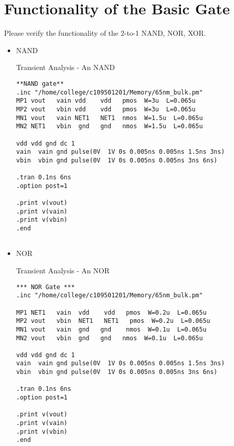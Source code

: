 \documentclass[a4paper]{article}
\newenvironment{code}{\captionsetup{type=listing, font=large, name=List.}}{}
\begin{document}
    \section {\bf Functionality of the Basic Gate}
    
        Please verify the functionality of the 2-to-1 NAND, NOR, XOR.
        \hspace*{1em}
        \begin{itemize}

            \item NAND

\begin{code}
    \caption{Transient Analysis - An NAND}
    \begin{verbatim}
**NAND gate**
.inc "/home/college/c109501201/Memory/65nm_bulk.pm"
MP1 vout   vain vdd    vdd   pmos  W=3u  L=0.065u
MP2 vout   vbin vdd    vdd   pmos  W=3u  L=0.065u
MN1 vout   vain NET1   NET1  nmos  W=1.5u  L=0.065u
MN2 NET1   vbin  gnd   gnd   nmos  W=1.5u  L=0.065u

vdd vdd gnd dc 1
vain  vain gnd pulse(0V  1V 0s 0.005ns 0.005ns 1.5ns 3ns)
vbin  vbin gnd pulse(0V  1V 0s 0.005ns 0.005ns 3ns 6ns)

.tran 0.1ns 6ns
.option post=1

.print v(vout)
.print v(vain)
.print v(vbin)
.end
        
\end{verbatim}
    \end{code}

\item NOR

\begin{code}
\caption{Transient Analysis - An NOR}
\begin{verbatim}
*** NOR Gate ***
.inc "/home/college/c109501201/Memory/65nm_bulk.pm"

MP1 NET1   vain  vdd    vdd   pmos  W=0.2u  L=0.065u
MP2 vout   vbin  NET1   NET1   pmos  W=0.2u  L=0.065u
MN1 vout   vain  gnd   gnd    nmos  W=0.1u  L=0.065u
MN2 vout   vbin  gnd   gnd   nmos  W=0.1u  L=0.065u

vdd vdd gnd dc 1
vain  vain gnd pulse(0V  1V 0s 0.005ns 0.005ns 1.5ns 3ns)
vbin  vbin gnd pulse(0V  1V 0s 0.005ns 0.005ns 3ns 6ns)

.tran 0.1ns 6ns
.option post=1

.print v(vout)
.print v(vain)
.print v(vbin)
.end
\end{verbatim}
    \end{code}


\end{itemize}
\end{document}
